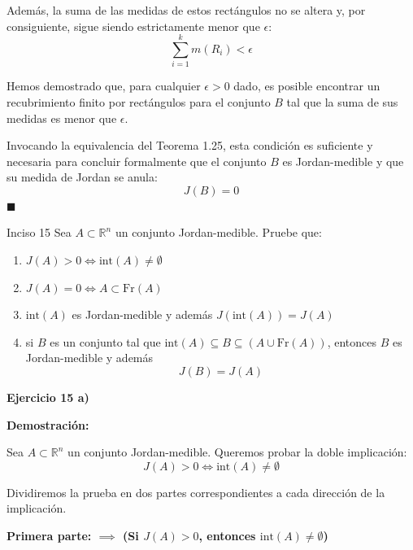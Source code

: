 \documentclass[11pt,letterpaper]{article}
\begin{document}
Además, la suma de las medidas de estos rectángulos no se altera y, por consiguiente, sigue siendo estrictamente menor que $\epsilon$:
\begin{equation*}
\sum_{i=1}^{k} m(R_i) < \epsilon
\end{equation*}

Hemos demostrado que, para cualquier $\epsilon > 0$ dado, es posible encontrar un recubrimiento finito por rectángulos para el conjunto $B$ tal que la suma de sus medidas es menor que $\epsilon$. 

Invocando la equivalencia del Teorema 1.25, esta condición es suficiente y necesaria para concluir formalmente que el conjunto $B$ es Jordan-medible y que su medida de Jordan se anula:
\begin{equation*}
J(B) = 0
\end{equation*}
\hfill $\blacksquare$

\begin{inciso}{Inciso 15}
Sea $A\subset\mathbb{R}^{n}$ un conjunto Jordan-medible. Pruebe que:
\begin{enumerate}[label=\alph*)]
    \item $J(A)>0\Leftrightarrow \text{int}(A)\neq\emptyset$
    \item $J(A)=0\Leftrightarrow A\subset \text{Fr}(A)$
    \item $\text{int}(A)$ es Jordan-medible y además $J(\text{int}(A))=J(A)$
    \item si $B$ es un conjunto tal que $\text{int}(A)\subseteq B\subseteq(A\cup \text{Fr}(A))$, entonces $B$ es Jordan-medible y además
    \begin{equation*}
        J(B)=J(A)
    \end{equation*}
\end{enumerate}
\end{inciso}

\textbf{Ejercicio 15 a)}

\textbf{Demostración:}

Sea $A \subset \mathbb{R}^n$ un conjunto Jordan-medible. Queremos probar la doble implicación:
\begin{equation*}
J(A) > 0 \iff \text{int}(A) \neq \emptyset
\end{equation*}

Dividiremos la prueba en dos partes correspondientes a cada dirección de la implicación.

\vspace{0.5cm}
\textbf{Primera parte: $\implies$ (Si $J(A) > 0$, entonces $\text{int}(A) \neq \emptyset$)}
\end{document}
